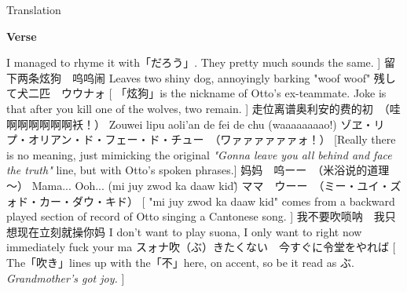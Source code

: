 \documentclass{ctexart}
\newenvironment{lverse}
	{
		\par
		\textbf{\LARGE Verse}
		\vspace{.5em}
		\par
	}
	{
		\par
	}
\begin{document}
\begin{section}{Translation}
\begin{lverse}
				I managed to rhyme it with「だろう」.
				They pretty much sounds the same.
			]
		\lline
			{留下两条炫狗　呜呜闹}
			{Leaves two shiny dog, annoyingly barking "woof woof"}
			{残して犬二匹　ウウナォ}
			[
				「炫狗」is the nickname of Otto's ex-teammate.
				Joke is that after you kill one of the wolves, two remain.
			]
		\lline
			{走位离谱奥利安的费的初　（哇啊啊啊啊啊啊袄！）}
			{Zouwei lipu aoli'an de fei de chu (waaaaaaaao!)}
			{ゾヱ・リプ・オリアン・ド・フェー・ド・チュー　（ワァァァァァァォ！）}
			[Really there is no meaning, just mimicking the original \textit{"Gonna leave you all behind and face the truth"} line, but with Otto's spoken phrases.]
		\lline
			{妈妈　呜ーー　（米浴说的道理～）}
			{Mama... Ooh... (mi juy zwod ka daaw kid\~)}
			{ママ　ウーー　（ミー・ユイ・ズォド・カー・ダウ・キド）}
			[
				"mi juy zwod ka daaw kid" comes from a backward played section of record of Otto singing a Cantonese song.
			]
		\lline
			{我不要吹唢呐　我只想现在立刻就操你妈}
			{I don't want to play suona, I only want to right now immediately fuck your ma}
			{スォナ吹（ぶ）きたくない　今すぐに令堂をやれば}
			[
				The「吹き」lines up with the「不」here, on accent, so be it read as ぶ.
				\textit{Grandmother's got joy.}
			]
	\end{lverse}
\end{section}
\end{document}
